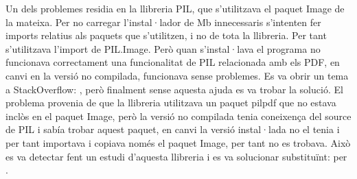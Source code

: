 \documentclass[letterpaper,11pt,catalan]{sphinxmanual}
\begin{document}
\begin{sphinxVerbatim}[commandchars=\\\{\}]
  
     
         \PYG{p}{[}
        \PYG{p}{]}
\end{sphinxVerbatim}

Un dels problemes residia en la llibreria PIL, que s'utilitzava el paquet Image de la mateixa.
Per no carregar l'instal·lador de Mb innecessaris s'intenten fer imports relatius als paquets
que s'utilitzen, i no de tota la llibreria. Per tant s'utilitzava l'import de PIL.Image. Però
quan s'instal·lava el programa no funcionava correctament una funcionalitat de PIL relacionada
amb els PDF, en canvi en la versió no compilada, funcionava sense problemes. Es va obrir un tema
a StackOverflow: ,
però finalment sense aquesta ajuda es va trobar la solució. El problema provenia de que la llibreria
utilitzava un paquet pilpdf que no estava inclòs en el paquet Image, però la versió no compilada
tenia coneixença del source de PIL i sabía trobar aquest paquet, en canvi la versió instal·lada
no el tenia i per tant importava i copiava només el paquet Image, per tant no es trobava. Això
es va detectar fent un estudi d'aquesta llibreria i es va solucionar substituïnt:  per .
\end{document}
